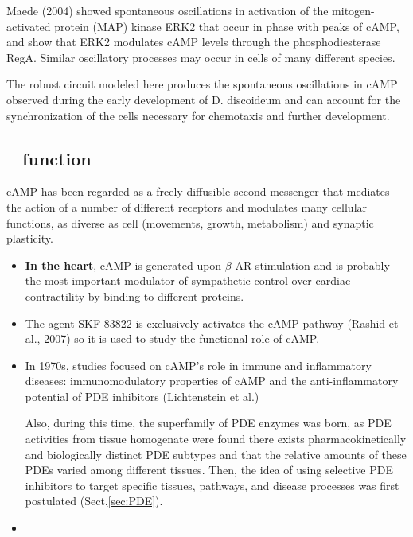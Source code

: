 Maede (2004) showed spontaneous oscillations in activation of the
mitogen-activated protein (MAP) kinase ERK2 that occur in phase with peaks of
cAMP, and show that ERK2 modulates cAMP levels through the phosphodiesterase
RegA. Similar oscillatory processes may occur in cells of many different
species.

The robust circuit modeled here produces the spontaneous oscillations in cAMP
observed during the early development of D. discoideum and can account for the
synchronization of the cells necessary for chemotaxis and further development.



\subsection{-- function}
\label{sec:cAMP-function}

cAMP has been regarded as a freely diffusible second messenger that mediates the
action of a number of different receptors and modulates many cellular functions,
as diverse as cell (movements, growth, metabolism) and synaptic plasticity.
\begin{itemize}
  \item  {\bf In the heart}, cAMP is generated upon $\beta$-AR stimulation
  and is probably the most important modulator of sympathetic control over
  cardiac contractility by binding to different proteins.
  
  \item  The agent SKF 83822 is exclusively activates the cAMP pathway (Rashid
  et al., 2007) so it is used to study the functional role of cAMP.

  \item In 1970s, studies focused on cAMP's role in immune and inflammatory
  diseases: immunomodulatory properties of cAMP and the anti-inflammatory
  potential of PDE inhibitors (Lichtenstein et al.)

Also, during this time, the superfamily of PDE enzymes was born, as PDE
activities from tissue homogenate were found there exists pharmacokinetically
and biologically distinct PDE subtypes and that the relative amounts of these
PDEs varied among different tissues.
Then, the idea of using selective PDE inhibitors to target specific tissues,
pathways, and disease processes was first postulated (Sect.\ref{sec:PDE}).

  \item 
\end{itemize}



